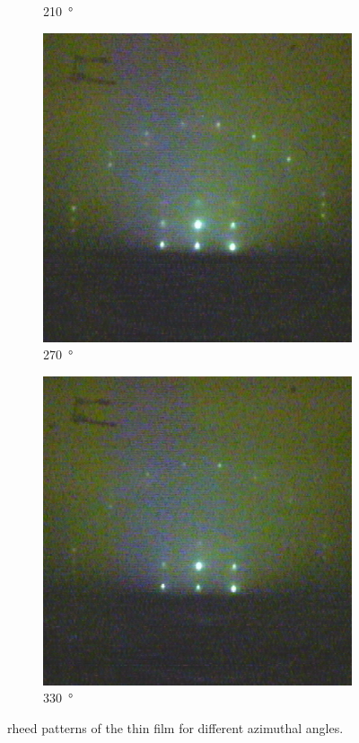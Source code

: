 \begin{figure}
\begin{subfigure}{0.2\linewidth}
        \caption{\qty{210}{\degree}}
    \end{subfigure}
    \begin{subfigure}{0.2\linewidth}
        \includegraphics[width=\textwidth]{../data/edited/2_2_293deg.pdf}
        \caption{\qty{270}{\degree}}
    \end{subfigure}
    \begin{subfigure}{0.2\linewidth}
        \includegraphics[width=\textwidth]{../data/edited/2_2_353deg.pdf}
        \caption{\qty{330}{\degree}}
    \end{subfigure}

    \caption{\ac{rheed} patterns of the  thin film for different azimuthal 
    angles. }
    \label{fig:rheed2}
\end{figure}
